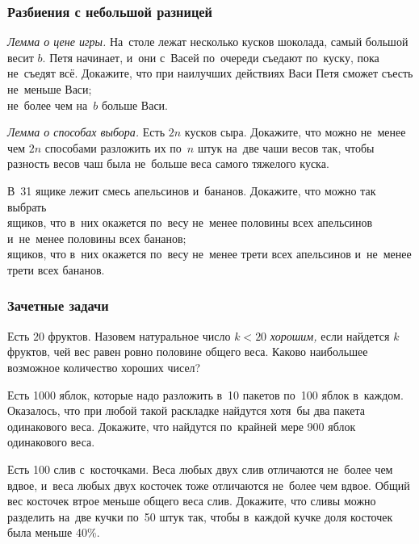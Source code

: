 \subsubsection*{Разбиения с небольшой разницей}

\begin{exercises}

\item\emph{Лемма о цене игры.}
На~столе лежат несколько кусков шоколада, самый большой весит $b$.
Петя начинает, и~они с~Васей по~очереди съедают по~куску, пока не~съедят всё.
Докажите, что при наилучших действиях Васи Петя сможет съесть
\\
\subproblem не~меньше Васи;
\\
\subproblem не~более чем на~$b$ больше Васи.

\item\emph{Лемма о способах выбора.}
Есть $2n$ кусков сыра.
Докажите, что можно не~менее чем $2n$ способами разложить их по~$n$ штук на~две
чаши весов так, чтобы разность весов чаш была не~больше веса самого тяжелого
куска.

\item
В~31 ящике лежит смесь апельсинов и~бананов.
Докажите, что можно так выбрать
\\
 ящиков, что в~них окажется по~весу не~менее половины всех апельсинов
и~не~менее половины всех бананов;
\\
 ящиков, что в~них окажется по~весу не~менее трети всех апельсинов
и~не~менее трети всех бананов.

\end{exercises}

\subsubsection*{Зачетные задачи}

\begin{problems}

\item
Есть $20$ фруктов.
Назовем натуральное число $k < 20$ \emph{хорошим,} если найдется $k$ фруктов,
чей вес равен ровно половине общего веса.
Каково наибольшее возможное количество хороших чисел?

\item
Есть 1000 яблок, которые надо разложить в~10 пакетов по~100 яблок в~каждом.
Оказалось, что при любой такой раскладке найдутся хотя~бы два пакета
одинакового веса.
Докажите, что найдутся по~крайней мере 900 яблок одинакового веса.

\item
Есть 100 слив с~косточками.
Веса любых двух слив отличаются не~более чем вдвое, и~веса любых двух косточек тоже отличаются не~более чем вдвое.
Общий
вес косточек втрое меньше общего веса слив.
Докажите, что сливы можно разделить
на~две кучки по~50 штук так, чтобы в~каждой кучке доля косточек была  меньше
40\%.

\end{problems}


